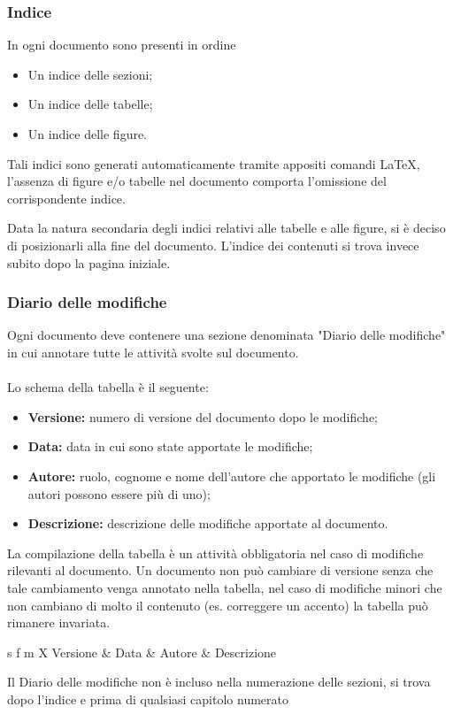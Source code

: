 \documentclass[a4paper]{report}
\begin{document}
	\subsubsection{Indice}
		In ogni documento sono presenti in ordine
		\begin{itemize}
			\item Un indice delle sezioni;
			\item Un indice delle tabelle;
			\item Un indice delle figure.
		\end{itemize}
		Tali indici sono generati automaticamente tramite appositi comandi \LaTeX, l'assenza di figure 
		e/o tabelle nel documento comporta l'omissione del corrispondente indice. 
		
	Data la natura secondaria degli indici relativi alle tabelle e alle figure, si è deciso di posizionarli alla fine del documento.
	L'indice dei contenuti si trova invece subito dopo la pagina iniziale.	
	\subsubsection{Diario delle modifiche} 
		Ogni documento deve contenere una sezione denominata "Diario delle modifiche" in cui annotare tutte le 
		attività svolte sul documento.
		\\ \\
		Lo schema della tabella è il seguente:
		\begin{itemize}
			\item \textbf{Versione:} numero di versione del documento dopo le modifiche;
			\item \textbf{Data:} data in cui sono state apportate le modifiche;
			\item \textbf{Autore:} ruolo, cognome e nome dell'autore che apportato le modifiche (gli autori possono essere
			più di uno);
			\item \textbf{Descrizione:} descrizione delle modifiche apportate al documento.
		\end{itemize}
		La compilazione della tabella è un attività obbligatoria nel caso di modifiche rilevanti al documento. Un documento 
		non può cambiare di versione senza che tale cambiamento venga annotato nella tabella, nel caso di modifiche 
		minori che non cambiano di molto il contenuto (es. correggere un accento) la tabella può rimanere invariata.
		\begin{table}[H]
			\begin{tabularx}{\textwidth}{s f m X}
				 Versione & Data & Autore & Descrizione \\
			\end{tabularx}
			\caption{Schema del diario delle modifiche \label{tab:table_label}}
		\end{table} 
		Il Diario delle modifiche non è incluso nella numerazione delle sezioni, si trova dopo l'indice e prima di qualsiasi
		 capitolo numerato
\end{document}
